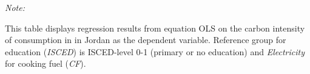 \begin{table}[htbp!]
\begin{adjustbox}{width = 1\textwidth, max height = 0.95\textheight, center}
\begin{threeparttable}[b]
         \begin{tablenotes}\item \medskip \textit{Note:}
            \item This table displays regression results from equation OLS on the carbon intensity of consumption in  in Jordan as the dependent variable. Reference group for education (\textit{ISCED}) is ISCED-level 0-1 (primary or no education) and \textit{Electricity} for cooking fuel (\textit{CF}).
         \end{tablenotes}
      \end{threeparttable}
   \end{adjustbox}
\end{table}


